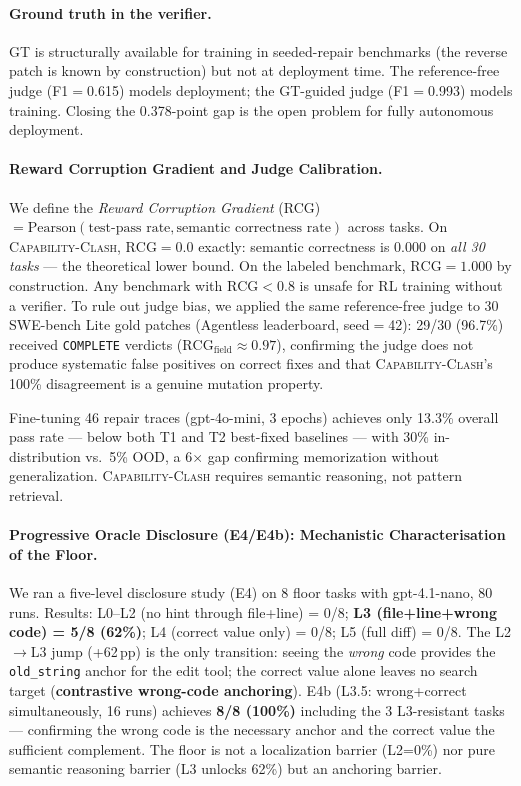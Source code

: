 \documentclass[sigconf,review,anonymous]{acmart}
\newcommand{\ccbench}{\textsc{Capability-Clash}}
\newcommand{\pp}{\,pp}
\begin{document}
\paragraph{Ground truth in the verifier.}
GT is structurally available for training in seeded-repair benchmarks (the reverse patch is known by construction) but not at deployment time. The reference-free judge (F1$=$0.615) models deployment; the GT-guided judge (F1$=$0.993) models training. Closing the 0.378-point gap is the open problem for fully autonomous deployment.

\paragraph{Reward Corruption Gradient and Judge Calibration.}
We define the \emph{Reward Corruption Gradient} (RCG) $= \text{Pearson}(\text{test-pass rate}, \text{semantic correctness rate})$ across tasks. On \ccbench{}, $\text{RCG} = 0.0$ exactly: semantic correctness is 0.000 on \emph{all 30 tasks} — the theoretical lower bound. On the labeled benchmark, $\text{RCG}=1.000$ by construction. Any benchmark with $\text{RCG}<0.8$ is unsafe for RL training without a verifier.
To rule out judge bias, we applied the same reference-free judge to 30 SWE-bench Lite gold patches (Agentless leaderboard, seed$=$42): 29/30 (96.7\%) received \texttt{COMPLETE} verdicts ($\text{RCG}_{\text{field}} \approx 0.97$), confirming the judge does not produce systematic false positives on correct fixes and that \ccbench{}'s 100\% disagreement is a genuine mutation property.

Fine-tuning 46 repair traces (gpt-4o-mini, 3 epochs) achieves only 13.3\% overall pass rate — below both T1 and T2 best-fixed baselines — with 30\% in-distribution vs.\ 5\% OOD, a 6$\times$ gap confirming memorization without generalization. \ccbench{} requires semantic reasoning, not pattern retrieval.

\paragraph{Progressive Oracle Disclosure (E4/E4b): Mechanistic Characterisation of the Floor.}
We ran a five-level disclosure study (E4) on 8 floor tasks with gpt-4.1-nano, 80 runs. Results: L0--L2 (no hint through file+line) = 0/8; \textbf{L3 (file+line+wrong code) = 5/8 (62\%)}; L4 (correct value only) = 0/8; L5 (full diff) = 0/8. The L2$\to$L3 jump (+62\pp{}) is the only transition: seeing the \emph{wrong} code provides the \texttt{old\_string} anchor for the edit tool; the correct value alone leaves no search target (\textbf{contrastive wrong-code anchoring}). E4b (L3.5: wrong+correct simultaneously, 16 runs) achieves \textbf{8/8 (100\%)} including the 3 L3-resistant tasks — confirming the wrong code is the necessary anchor and the correct value the sufficient complement. The floor is not a localization barrier (L2=0\%) nor pure semantic reasoning barrier (L3 unlocks 62\%) but an anchoring barrier.
\end{document}
